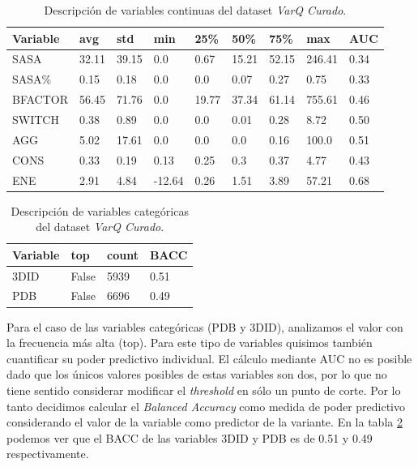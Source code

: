 \begin{table}[H]
\centering
\begin{tabular}{|l|l|l|l|l|l|l|l|l|}
\hline
Variable & avg  & std   & min    & 25\%  & 50\%  & 75\%  & max & AUC\\ \hline
SASA    & 32.11 & 39.15 & 0.0    & 0.67  & 15.21 & 52.15 & 246.41 & 0.34 \\ \hline
SASA\%  & 0.15  & 0.18  & 0.0    & 0.0   & 0.07  & 0.27  & 0.75 & 0.33  \\ \hline
BFACTOR & 56.45 & 71.76 & 0.0    & 19.77 & 37.34 & 61.14 & 755.61 & 0.46 \\ \hline
SWITCH  & 0.38  & 0.89  & 0.0    & 0.0   & 0.01  & 0.28  & 8.72 &  0.50  \\ \hline
AGG     & 5.02  & 17.61 & 0.0    & 0.0   & 0.0   & 0.16  & 100.0 &  0.51\\ \hline
CONS    & 0.33  & 0.19  & 0.13   & 0.25  & 0.3   & 0.37  & 4.77 & 0.43\\ \hline
ENE     & 2.91  & 4.84  & -12.64 & 0.26  & 1.51  & 3.89 & 57.21 & 0.68\\ \hline 
\end{tabular}
\caption{Descripción de variables continuas del dataset \textit{VarQ Curado}.}
\label{tab:descripcion_varq_cont}
\end{table}

\begin{table}[H]
\centering
\begin{tabular}{|l|l|l|l|}
\hline
Variable & top  & count & BACC \\ \hline
3DID    & False & 5939 & 0.51\\ \hline
PDB  & False  & 6696 & 0.49\\ \hline
\end{tabular}
\caption{Descripción de variables categóricas del dataset \textit{VarQ Curado}.}
\label{tab:descripcion_varq_cat}
\end{table}

Para el caso de las variables categóricas (PDB y 3DID), analizamos el valor con la frecuencia más alta (top). Para este tipo de variables quisimos también cuantificar su poder predictivo individual. El cálculo mediante AUC no es posible dado que los únicos valores posibles de estas variables son dos, por lo que no tiene sentido considerar modificar el \textit{threshold} en sólo un punto de corte. Por lo tanto decidimos calcular el \textit{Balanced Accuracy} como medida de poder predictivo considerando el valor de la variable como predictor de la variante. En la tabla \ref{tab:descripcion_varq_cat} podemos ver que el BACC de las variables 3DID y PDB es de 0.51 y 0.49 respectivamente. 

